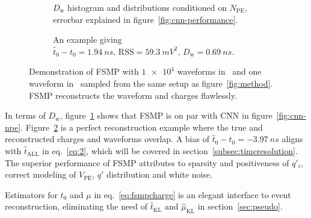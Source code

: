 \begin{figure}[H]
  \begin{subfigure}[b]{.45\textwidth}
    \centering
    \resizebox{1.05\textwidth}{!}{}
    \caption{\label{fig:fsmp-npe} $D_\mathrm{w}$ histogram and distributions conditioned on $N_{\mathrm{PE}}$, errorbar explained in figure~\ref{fig:cnn-performance}.}
  \end{subfigure}
  \hspace{0.5em}
  \begin{subfigure}[b]{.55\textwidth}
    \centering
    \resizebox{\textwidth}{!}{}
    \caption{\label{fig:fsmp} An example giving \\ $\hat{t}_0 - t_0=\SI{1.94}{ns}$, $\mathrm{RSS}=\SI{59.3}{mV^2}$, $D_\mathrm{w}=\SI{0.69}{ns}$.}
  \end{subfigure}
  \caption{\label{fig:fsmp-performance}Demonstration of FSMP with $\num[retain-unity-mantissa=false]{1e4}$ waveforms in~ and one waveform in~ sampled from the same setup as figure~\ref{fig:method}.  FSMP reconstructs the waveform and charges flawlessly.}
\end{figure}
In terms of $D_\mathrm{w}$, figure~\ref{fig:fsmp-npe} shows that FSMP is on par with CNN in figure~\ref{fig:cnn-npe}.  Figure~\ref{fig:fsmp} is a perfect reconstruction example where the true and reconstructed charges and waveforms overlap.  A bias of $\hat{t}_0 - t_0=\SI{-3.97}{ns}$ aligns with $\hat{t}_\mathrm{ALL}$ in eq.~\eqref{eq:2}, which will be covered in section~\ref{subsec:timeresolution}.  The superior performance of FSMP attributes to sparsity and positiveness of $q'_i$, correct modeling of $V_\mathrm{PE}$, $q'$ distribution and white noise.

Estimators for $t_0$ and $\mu$ in eq.~\eqref{eq:fsmpcharge} is an elegant interface to event reconstruction, eliminating the need of $\hat{t}_\mathrm{KL}$ and $\hat{\mu}_\mathrm{KL}$ in section~\ref{sec:pseudo}.
